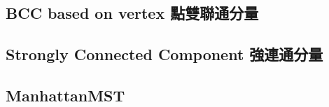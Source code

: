 \documentclass[a4paper,10pt,twocolumn,oneside]{article}
\begin{document}
%

%

\subsection{BCC based on vertex 點雙聯通分量}


\subsection{Strongly Connected Component 強連通分量}


%

%

%

%

\subsection{ManhattanMST}

\end{document}

